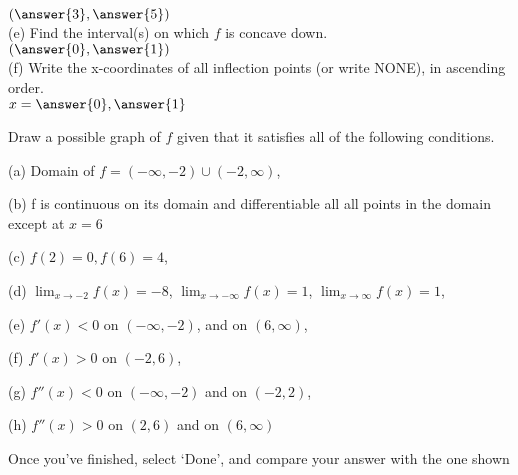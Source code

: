 \documentclass{ximera}
\begin{document}
\begin{exercise}
$(\answer{3},\answer{5})$\\

(e) Find the interval(s) on which $f$ is concave down. \\

$(\answer{0},\answer{1})$\\

(f) Write the x-coordinates of all inflection points (or write NONE), in ascending order.\\

$x=\answer{0},\answer{1}$\\
\end{exercise}

\begin{exercise}
Draw a possible graph of $f$ given that it satisfies all of the following conditions.

(a) Domain of $f=(-\infty,-2)\cup (-2,\infty)$,

(b) f is continuous on its domain and differentiable all all points in the domain except at $x=6$

(c) $f(2)=0, f(6)=4$,

(d) $\lim_{x\to -2} f(x)=-8$, $\lim_{x\to-\infty}f(x)=1$, $\lim_{x\to\infty}f(x)=1$,

(e) $f'(x)<0$ on $(-\infty,-2)$, and on $(6,\infty)$,

(f) $f'(x)>0$ on $(-2,6)$,

(g) $f''(x)<0$ on $(-\infty,-2)$ and on $(-2,2)$,

(h) $f''(x)>0$ on $(2,6)$ and on $(6,\infty)$

Once you've finished, select `Done', and compare your answer with the one shown

\begin{multipleChoice}
\end{multipleChoice}
\begin{exercise}
\begin{image}
\end{image}
\end{exercise}
\end{exercise}
\end{document}

